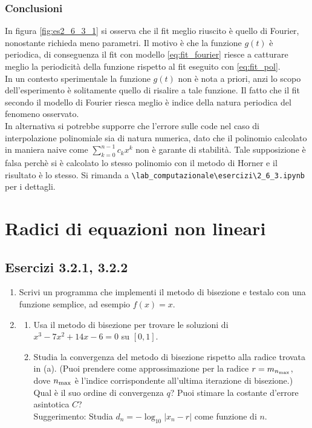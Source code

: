 \documentclass[letterpaper, 12pt]{article}
\numberwithin{equation}{section}    %
\begin{document}
\subsubsection{Conclusioni}
In figura \ref{fig:es2_6_3_1} si osserva che il fit meglio riuscito è quello di Fourier, nonostante
richieda meno parametri. Il motivo è che la funzione $g(t)$ è periodica, di conseguenza il fit con modello 
\ref{eq:fit_fourier} riesce a catturare meglio la periodicità della funzione rispetto al fit eseguito con 
\ref{eq:fit_pol}. \\
In un contesto sperimentale la funzione $g(t)$ non è nota a priori, anzi lo scopo dell'esperimento è 
solitamente quello di risalire a tale funzione. Il fatto che il fit secondo il modello di Fourier riesca meglio
è indice della natura periodica del fenomeno osservato. \\
In alternativa si potrebbe supporre che l'errore sulle code nel caso di interpolazione polinomiale 
sia di natura numerica, 
dato che il polinomio calcolato in maniera naive come $\sum_{k=0}^{n-1} c_k x^k$ non è garante di stabilità.
Tale supposizione è falsa perchè si è calcolato lo stesso polinomio con il metodo di Horner e il risultato 
è lo stesso. Si rimanda a \verb|\lab_computazionale\esercizi\2_6_3.ipynb| per i dettagli. \\

\section{Radici di equazioni non lineari}
\subsection{Esercizi 3.2.1, 3.2.2}

\begin{enumerate}
    \item Scrivi un programma che implementi il metodo di bisezione e testalo con una funzione semplice, ad esempio $f(x)=x$.
    \item 
    \begin{enumerate}
        \item Usa il metodo di bisezione per trovare le soluzioni di $x^3 - 7x^2 + 14x - 6 = 0$ su $[0,1]$.
        \item Studia la convergenza del metodo di bisezione rispetto alla radice trovata in (a). (Puoi prendere come approssimazione per la radice $r=m_{n_{\rm max}}$, dove $n_{\rm max}$ è l'indice corrispondente all'ultima iterazione di bisezione.) \\
        Qual è il suo ordine di convergenza $q$? Puoi stimare la costante d'errore asintotica $C$? \\
        Suggerimento: Studia $d_n=-\log_{10}|x_{n}-r|$ come funzione di $n$.
    \end{enumerate}
\end{enumerate}
\end{document}
